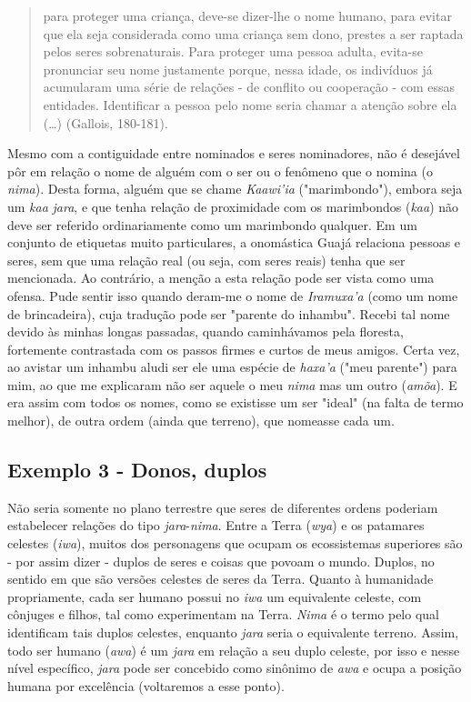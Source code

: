 \begin{quote}
para proteger uma criança, deve-se dizer-lhe o nome humano, para evitar
que ela seja considerada como uma criança sem dono, prestes a ser
raptada pelos seres sobrenaturais. Para proteger uma pessoa adulta,
evita-se pronunciar seu nome justamente porque, nessa idade, os
indivíduos já acumularam uma série de relações - de conflito ou
cooperação - com essas entidades. Identificar a pessoa pelo nome seria
chamar a atenção sobre ela (\ldots{}) (Gallois, 180-181).
\end{quote}

Mesmo com a contiguidade entre nominados e seres nominadores, não é
desejável pôr em relação o nome de alguém com o ser ou o fenômeno que o
nomina (o \emph{nima}). Desta forma, alguém que se chame \emph{Kaawi'ia}
("marimbondo"), embora seja um \emph{kaa} \emph{jara}, e que tenha
relação de proximidade com os marimbondos (\emph{kaa}) não deve ser
referido ordinariamente como um marimbondo qualquer. Em um conjunto de
etiquetas muito particulares, a onomástica Guajá relaciona pessoas e
seres, sem que uma relação real (ou seja, com seres reais) tenha que ser
mencionada. Ao contrário, a menção a esta relação pode ser vista como
uma ofensa. Pude sentir isso quando deram-me o nome de \emph{Iramuxa'a}
(como um nome de brincadeira), cuja tradução pode ser "parente do
inhambu". Recebi tal nome devido às minhas longas passadas, quando
caminhávamos pela floresta, fortemente contrastada com os passos firmes
e curtos de meus amigos. Certa vez, ao avistar um inhambu aludi ser ele
uma espécie de \emph{haxa'a} ("meu parente") para mim, ao que me
explicaram não ser aquele o meu \emph{nima} mas um outro (\emph{amõa}).
E era assim com todos os nomes, como se existisse um ser "ideal" (na
falta de termo melhor), de outra ordem (ainda que terreno), que nomeasse
cada um.

\subsection{Exemplo 3 - Donos, duplos}

Não seria somente no plano terrestre que seres de diferentes ordens
poderiam estabelecer relações do tipo \emph{jara}-\emph{nima}. Entre a
Terra (\emph{wya}) e os patamares celestes (\emph{iwa}), muitos dos
personagens que ocupam os ecossistemas superiores são - por assim dizer
- duplos de seres e coisas que povoam o mundo. Duplos, no sentido em que
são versões celestes de seres da Terra. Quanto à humanidade
propriamente, cada ser humano possui no \emph{iwa} um equivalente
celeste, com cônjuges e filhos, tal como experimentam na Terra.
\emph{Nima} é o termo pelo qual identificam tais duplos celestes,
enquanto \emph{jara} seria o equivalente terreno. Assim, todo ser humano
(\emph{awa}) é um \emph{jara} em relação a seu duplo celeste, por isso e
nesse nível específico, \emph{jara} pode ser concebido como sinônimo de
\emph{awa} e ocupa a posição humana por excelência (voltaremos a esse
ponto).

